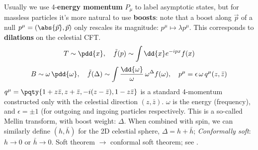 \documentclass[a4paper
	,10pt
]{article}
\begin{document}
	Usually we use 4-\textbf{energy momentum} $P_\mu$ to label asymptotic states, but for massless particles it's more natural to use \textbf{boosts}: note that a boost along $\vec{p}$ of a null $p^\mu = (\abs{\vec{p}},\vec{p})$ only rescales its magnitude: $p^\mu\mapsto \lambda p^\mu$. This corresponds to \textbf{dilations} on the celestial CFT. 
	\begin{equation}
		T\sim \pdd{x},
	\quad
		\tilde{f}(p)
		\sim \int \dd{x} e^{-ipx} f(x)
	\end{equation}
	\vspace{-.5\baselineskip}
	\begin{equation}
		B\sim \omega\,\pdd{\omega},
	\quad
		\tilde{f}(\Delta)
		\sim \int \frac{\dd{\omega}}{\omega}\,
				\omega^\Delta f(\omega),
	\quad
		p^\mu = \epsilon\,\omega\, q^\mu(z,\bar{z})
	\end{equation}
	$q^\mu = \pqty{
		1 + z\bar{z},
		z + \bar{z},
		-i(z - \bar{z}),
		1 - z\bar{z}
	}$ is a standard 4-momentum constructed only with the celestial direction $(z,\bar{z})$. $\omega$ is the energy (frequency), and $\epsilon = \pm 1$ (for outgoing and ingoing particles respectively. 
	This is a so-called Mellin transform, with boost weight: $\Delta$. When combined with spin, we can similarly define $(h,\bar{h})$ for the 2D celestial sphere, $\Delta = h + \bar{h}$; \textit{Conformally soft}: $h\to 0$ or $\bar{h}\to 0$. Soft theorem $\to$ conformal soft theorem; see \cite{Pate:2019mfs}. 
	
	

	
	
	

\vspace{1.2\baselineskip}
\raggedright
\printbibliography[%
	,heading = bibintoc
]
\end{document}
